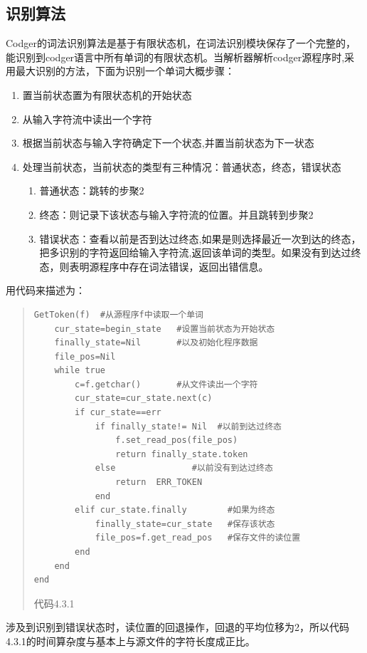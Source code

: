 \documentclass[a4paper,11pt]{article}
\begin{document}
\begin{CJK}{UTF8}{gbsn}
\subsection{识别算法}
Codger的词法识别算法是基于有限状态机，在词法识别模块保存了一个完整的，能识别到codger语言中所有单词的有限状态机。当解析器解析codger源程序时,采用最大识别的方法，下面为识别一个单词大概步骤：
\begin{enumerate}
 \item 置当前状态置为有限状态机的开始状态
 \item 从输入字符流中读出一个字符
 \item 根据当前状态与输入字符确定下一个状态,并置当前状态为下一状态
 \item 处理当前状态，当前状态的类型有三种情况：普通状态，终态，错误状态
 \begin{enumerate}
 	\item 普通状态：跳转的步聚2
 	\item 终态：则记录下该状态与输入字符流的位置。并且跳转到步聚2
 	\item 错误状态：查看以前是否到达过终态,如果是则选择最近一次到达的终态，把多识别的字符返回给输入字符流,返回该单词的类型。如果没有到达过终态，则表明源程序中存在词法错误，返回出错信息。
 \end{enumerate}
\end{enumerate}
用代码来描述为：
\begin{quote}
\begin{verbatim}
GetToken(f)  #从源程序f中读取一个单词
    cur_state=begin_state   #设置当前状态为开始状态
    finally_state=Nil       #以及初始化程序数据
    file_pos=Nil
    while true 
        c=f.getchar()       #从文件读出一个字符
        cur_state=cur_state.next(c)   
        if cur_state==err         
            if finally_state!= Nil  #以前到达过终态
                f.set_read_pos(file_pos)  
                return finally_state.token  
            else               #以前没有到达过终态
                return  ERR_TOKEN  
            end
        elif cur_state.finally        #如果为终态
            finally_state=cur_state   #保存该状态
            file_pos=f.get_read_pos   #保存文件的读位置
        end
    end
end 
\end{verbatim}
\begin{center}
 代码4.3.1
\end{center}
\end{quote}
涉及到识别到错误状态时，读位置的回退操作，回退的平均位移为2，所以代码4.3.1的时间算杂度与基本上与源文件的字符长度成正比。
  

\end{CJK}
\end{document}

